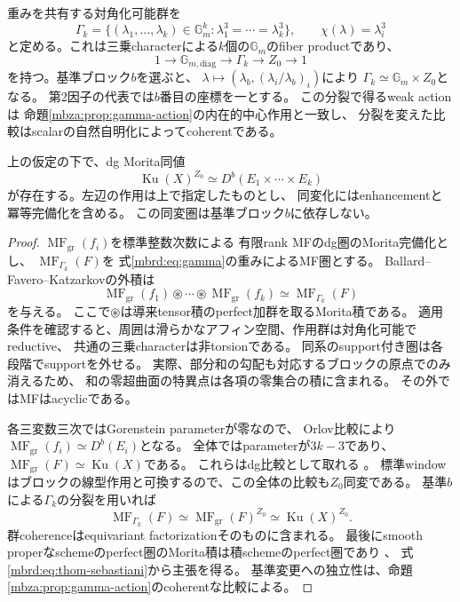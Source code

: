 重みを共有する対角化可能群を
\begin{equation}\label{mbrd:eq:gamma}
 \Gamma_k=
 \{(\lambda_1,\ldots,\lambda_k)\in\mathbb G_m^k:
      \lambda_1^3=\cdots=\lambda_k^3\},\qquad
 \chi(\lambda)=\lambda_i^3
\end{equation}
と定める。これは三乗characterによる$k$個の$\mathbb G_m$のfiber productであり、
\[
 1\longrightarrow\mathbb G_{m,\mathrm{diag}}
  \longrightarrow\Gamma_k\longrightarrow Z_0\longrightarrow1
\]
を持つ。基準ブロック$b$を選ぶと、
$\lambda\mapsto(\lambda_b,(\lambda_i/\lambda_b)_i)$により
$\Gamma_k\simeq\mathbb G_m\times Z_0$となる。
第2因子の代表では$b$番目の座標を一とする。
この分裂で得るweak actionは
命題\ref{mbza:prop:gamma-action}の内在的中心作用と一致し、
分裂を変えた比較はscalarの自然自明化によってcoherentである。

\begin{theorem}[分離和の中心同変圏の積表示]
\label{mbrd:thm:split-product}
上の仮定の下で、dg Morita同値
\begin{equation}\label{mbrd:eq:split-product}
 \operatorname{Ku}(X)^{Z_0}
 \simeq
 D^b(E_1\times\cdots\times E_k)
\end{equation}
が存在する。左辺の作用は上で指定したものとし、
同変化にはenhancementと冪等完備化を含める。
この同変圏は基準ブロック$b$に依存しない。
\end{theorem}
\begin{proof}
$\operatorname{MF}_{\mathrm{gr}}(f_i)$を標準整数次数による
有限rank MFのdg圏のMorita完備化とし、
$\operatorname{MF}_{\Gamma_k}(F)$を
式\eqref{mbrd:eq:gamma}の重みによるMF圏とする。
Ballard--Favero--Katzarkovの外積は
\begin{equation}\label{mbrd:eq:thom-sebastiani}
 \operatorname{MF}_{\mathrm{gr}}(f_1)
     \mathbin{\circledast}\cdots\mathbin{\circledast}
 \operatorname{MF}_{\mathrm{gr}}(f_k)
 \simeq \operatorname{MF}_{\Gamma_k}(F)
\end{equation}
を与える\cite[Definition~3.50, Corollary~5.18]{NFBFKKernels}。
ここで$\circledast$は導来tensor積のperfect加群を取るMorita積である。
適用条件を確認すると、周囲は滑らかなアフィン空間、作用群は対角化可能でreductive、
共通の三乗characterは非torsionである。
同系のsupport付き圏は各段階でsupportを外せる。
実際、部分和の勾配も対応するブロックの原点でのみ消えるため、
和の零超曲面の特異点は各項の零集合の積に含まれる。
その外ではMFはacyclicである。

各三変数三次ではGorenstein parameterが零なので、
Orlov比較により
$\operatorname{MF}_{\mathrm{gr}}(f_i)\simeq D^b(E_i)$となる。
全体ではparameterが$3k-3$であり、
$\operatorname{MF}_{\mathrm{gr}}(F)\simeq\operatorname{Ku}(X)$である。
これらはdg比較として取れる
\cite[Theorem~6.13]{NFBFKKernels}。
標準windowはブロックの線型作用と可換するので、この全体の比較も$Z_0$同変である。
基準$b$による$\Gamma_k$の分裂を用いれば
\[
 \operatorname{MF}_{\Gamma_k}(F)
 \simeq \operatorname{MF}_{\mathrm{gr}}(F)^{Z_0}
 \simeq \operatorname{Ku}(X)^{Z_0}.
\]
群coherenceはequivariant factorizationそのものに含まれる。
最後にsmooth properなschemeのperfect圏のMorita積は積schemeのperfect圏であり
\cite[式~(1.1)]{MBRDBFKFurther}、
式\eqref{mbrd:eq:thom-sebastiani}から主張を得る。
基準変更への独立性は、命題\ref{mbza:prop:gamma-action}のcoherentな比較による。
\end{proof}

